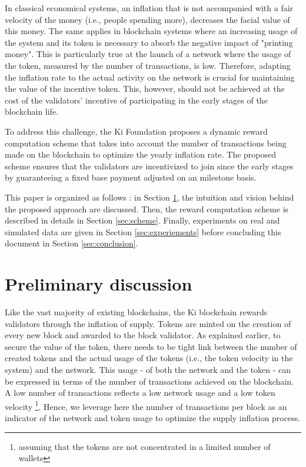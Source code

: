 \documentclass[conference]{IEEEtran}
\begin{document}
In classical economical systems, an inflation that is not accompanied with a fair velocity of the money (i.e., people spending more), decreases the facial value of this money. The same applies in blockchain systems where an increasing usage of the system and its token is necessary to absorb the negative impact of "printing money". This is particularly true at the launch of a network where the usage of the token, measured by the number of transactions, is low. Therefore, adapting the inflation rate to the actual activity on the network is crucial for maintaining the value of the incentive token. This, however, should not be  achieved at the cost of the validators' incentive of participating in the early stages of the blockchain life. 

To address this challenge, the Ki Foundation proposes a dynamic reward computation scheme that takes into account the number of transactions being made on the blockchain to optimize the yearly inflation rate. The proposed scheme ensures that the validators are incentivized to join since the early stages by guaranteeing a fixed base payment adjusted on an milestone basis. 

This paper is organized as follows :  in Section \ref{sec:discussion}, the intuition and vision behind the proposed approach are discussed. Then, the reward computation scheme is described in details in Section \ref{sec:scheme}. Finally, experiments on real and simulated data are given in Section \ref{sec:experiements} before concluding this document in Section \ref{sec:conclusion}.

\section{Preliminary discussion}
\label{sec:discussion}
Like the vast majority of existing blockchains, the Ki blockchain rewards validators through the inflation of supply. Tokens are minted on the creation of every new block and awarded to the block validator. As explained earlier, to secure the value of the token, there needs to be tight link between the number of created tokens and the actual usage of the tokens (i.e., the token velocity in the system) and the network. This usage - of both the network and the token - can be expressed in terms of the number of transactions achieved on the blockchain. A low number of transactions reflects a low network usage and a low token velocity \footnote{assuming that the tokens are not concentrated in a limited number of wallets}. Hence, we leverage here the number of transactions per block as an indicator of the network and token usage to optimize the  supply inflation process.
\end{document}
